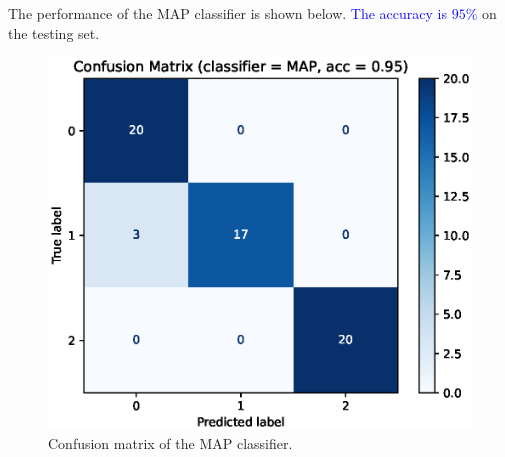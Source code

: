 The performance of the MAP classifier is shown below. \textcolor{blue}{The accuracy is $95\%$} on the testing set.
    \begin{figure}[H]
        \centering
        \includegraphics[scale=1.0]{cm_MAP.eps}
        \caption{Confusion matrix of the MAP classifier.}
        \label{fig:cm_map}
    \end{figure}